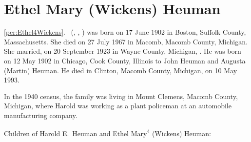 \section{Ethel Mary (Wickens) Heuman}

\ref{per:Ethel4Wickens}.\  (, , ) was born on 17 June 1902 in Boston, Suffolk County, Massachusetts.\cite{Ethel4WickensBirth} She died on 27 July 1967 in Macomb, Macomb County, Michigan.\cite{Ethel4WickensDeath} She married, on 20 September 1923 in Wayne County, Michigan, .\cite{Ethel4WickensMarriage} He was born on 12 May 1902 in Chicago, Cook County, Illinois\cite{HaroldHeumanDeath,HaroldHeumanDraft} to John Heuman and Augusta (Martin) Heuman.\cite{Census1910HaroldHeuman,GraceHeumanBirth} He died in Clinton, Macomb County, Michigan, on 10 May 1993.\cite{HaroldHeumanDeath}

In the 1940 census, the family was living in Mount Clemens, Macomb County, Michigan, where Harold was working as a plant policeman at an automobile manufacturing company.\cite{Census1940HaroldHeuman}

\begin{KidsIntro}
	Children of Harold E.\ Heuman and Ethel Mary\textsuperscript{4} (Wickens) Heuman:
\end{KidsIntro}

\begin{Kids}
	
	
\end{Kids}